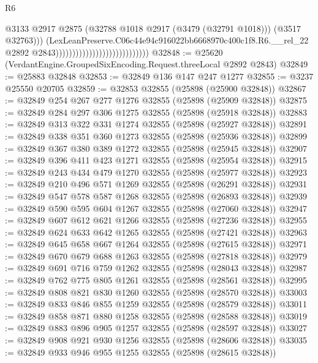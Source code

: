\begin{lexlean}{R6}
\begin{coremodule}
                                                              @3133
                                                              @2917
                                                              @2875
                                                              (@32788
                                                                @1018
                                                                @2917
                                                                (@3479 (@32791 @1018)))
                                                              (@3517 @32763)))
                                                          (LexLeanPreserve.C06c44e94c916022bb6668970c400c1f8.R6.__rel_22
                                                            @2892
                                                            @2843))))))))))))))))))))))))))))
@32848 := @25620 (VerdantEngine.GroupedSixEncoding.Request.threeLocal @2892 @2843)
@32849 := @25883 @32848
@32853 := @32849 @136 @147 @247 @1277
@32855 := @3237 @25550 @20705
@32859 := @32853 @32855 (@25898 (@25900 @32848))
@32867 := @32849 @254 @267 @277 @1276 @32855 (@25898 (@25909 @32848))
@32875 := @32849 @284 @297 @306 @1275 @32855 (@25898 (@25918 @32848))
@32883 := @32849 @313 @322 @331 @1274 @32855 (@25898 (@25927 @32848))
@32891 := @32849 @338 @351 @360 @1273 @32855 (@25898 (@25936 @32848))
@32899 := @32849 @367 @380 @389 @1272 @32855 (@25898 (@25945 @32848))
@32907 := @32849 @396 @411 @423 @1271 @32855 (@25898 (@25954 @32848))
@32915 := @32849 @243 @434 @479 @1270 @32855 (@25898 (@25977 @32848))
@32923 := @32849 @210 @496 @571 @1269 @32855 (@25898 (@26291 @32848))
@32931 := @32849 @547 @578 @587 @1268 @32855 (@25898 (@26893 @32848))
@32939 := @32849 @590 @595 @604 @1267 @32855 (@25898 (@27060 @32848))
@32947 := @32849 @607 @612 @621 @1266 @32855 (@25898 (@27236 @32848))
@32955 := @32849 @624 @633 @642 @1265 @32855 (@25898 (@27421 @32848))
@32963 := @32849 @645 @658 @667 @1264 @32855 (@25898 (@27615 @32848))
@32971 := @32849 @670 @679 @688 @1263 @32855 (@25898 (@27818 @32848))
@32979 := @32849 @691 @716 @759 @1262 @32855 (@25898 (@28043 @32848))
@32987 := @32849 @762 @775 @805 @1261 @32855 (@25898 (@28561 @32848))
@32995 := @32849 @808 @821 @830 @1260 @32855 (@25898 (@28570 @32848))
@33003 := @32849 @833 @846 @855 @1259 @32855 (@25898 (@28579 @32848))
@33011 := @32849 @858 @871 @880 @1258 @32855 (@25898 (@28588 @32848))
@33019 := @32849 @883 @896 @905 @1257 @32855 (@25898 (@28597 @32848))
@33027 := @32849 @908 @921 @930 @1256 @32855 (@25898 (@28606 @32848))
@33035 := @32849 @933 @946 @955 @1255 @32855 (@25898 (@28615 @32848))

\end{coremodule}
\end{lexlean}
